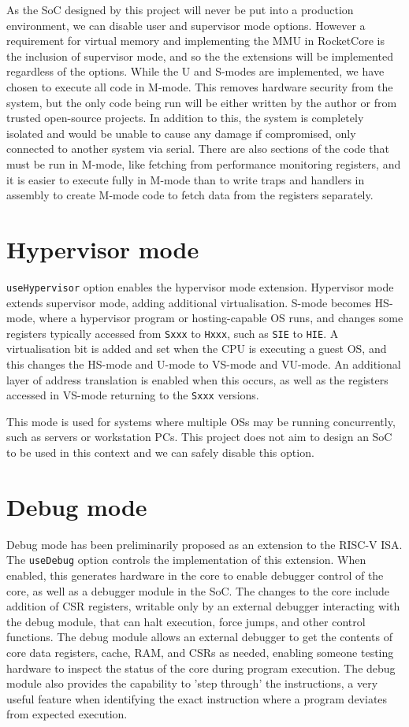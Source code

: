As the SoC designed by this project will never be put into a production environment, we can disable user and supervisor mode options. However a requirement for virtual memory and implementing the MMU in RocketCore is the inclusion of supervisor mode, and so the the extensions will be implemented regardless of the options. While the U and S-modes are implemented, we have chosen to execute all code in M-mode. This removes hardware security from the system, but the only code being run will be either written by the author or from trusted open-source projects. In addition to this, the system is completely isolated and would be unable to cause any damage if compromised, only connected to another system via serial. There are also sections of the code that must be run in M-mode, like fetching from performance monitoring registers, and it is easier to execute fully in M-mode than to write traps and handlers in assembly to create M-mode code to fetch data from the registers separately.

\section{Hypervisor mode}
\texttt{useHypervisor} option enables the hypervisor mode extension. Hypervisor mode extends supervisor mode, adding additional virtualisation. S-mode becomes HS-mode, where a hypervisor program or hosting-capable OS runs, and changes some registers typically accessed from \texttt{Sxxx} to \texttt{Hxxx}, such as \texttt{SIE} to \texttt{HIE}. A virtualisation bit is added and set when the CPU is executing a guest OS, and this changes the HS-mode and U-mode to VS-mode and VU-mode. An additional layer of address translation is enabled when this occurs, as well as the registers accessed in VS-mode returning to the \texttt{Sxxx} versions.

This mode is used for systems where multiple OSs may be running concurrently, such as servers or workstation PCs. This project does not aim to design an SoC to be used in this context and we can safely disable this option.

\section{Debug mode}
Debug mode has been preliminarily proposed as an extension to the RISC-V ISA. The \texttt{useDebug} option controls the implementation of this extension. When enabled, this generates hardware in the core to enable debugger control of the core, as well as a debugger module in the SoC. The changes to the core include addition of CSR registers, writable only by an external debugger interacting with the debug module, that can halt execution, force jumps, and other control functions. The debug module allows an external debugger to get the contents of core data registers, cache, RAM, and CSRs as needed, enabling someone testing hardware to inspect the status of the core during program execution. The debug module also provides the capability to 'step through' the instructions, a very useful feature when identifying the exact instruction where a program deviates from expected execution.


